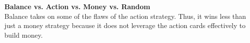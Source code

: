 \documentclass[11pt, oneside]{article}   	%
\begin{document}
\begin{figure}[H]
\begin {minipage}{0.49\textwidth}
   \end{minipage}
\end{figure}


\textbf{Balance vs. Action vs. Money vs. Random}\\

Balance takes on some of the flaws of the action strategy. Thus, it wins less than just a money strategy because it does not leverage the action cards effectively to build money.

\begin{figure}[H] \centering
   \begin{minipage}{0.49\textwidth}
   \end{minipage}
   \begin {minipage}{0.49\textwidth}

\end{minipage}
\end{figure}
\end{document}
